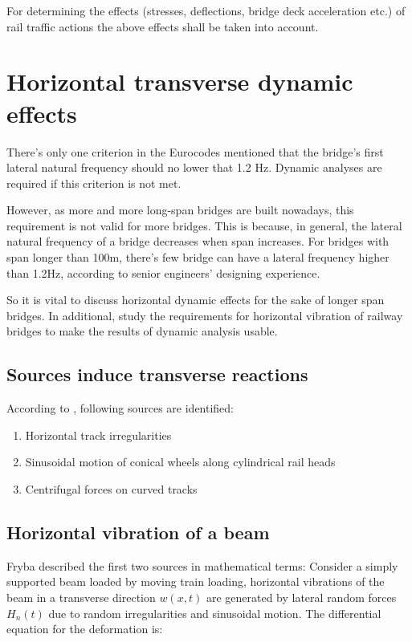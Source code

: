 For determining the effects (stresses, deflections, bridge deck acceleration etc.) of rail traffic actions the above effects shall be taken into account.


\section{Horizontal transverse dynamic effects}
There's only one criterion in the Eurocodes mentioned that the bridge's first lateral natural frequency should no lower that 1.2 Hz. Dynamic analyses are required if this criterion is not met. 

However, as more and more long-span bridges are built nowadays, this requirement is not valid for more bridges. This is because, in general, the lateral natural frequency of a bridge decreases when span increases. For bridges with span longer than 100m, there's few bridge can have a lateral frequency higher than 1.2Hz, according to senior engineers' designing experience.

So it is vital to discuss horizontal dynamic effects for the sake of longer span bridges. In additional, study the requirements for horizontal vibration of railway bridges to make the results of dynamic analysis usable.

\subsection{Sources induce transverse reactions}
According to \cite{da2007dynamic}\cite{fryba1996dynamics}\cite{EC12}, following sources are identified:

\begin{enumerate} [-]
	\item Horizontal track irregularities
	\item Sinusoidal motion of conical wheels along cylindrical rail heads
	\item Centrifugal forces on curved tracks
\end{enumerate}

\subsection{Horizontal vibration of a beam}

Fryba\cite{fryba1996dynamics} described the first two sources in mathematical terms:
Consider a simply supported beam loaded by moving train loading, horizontal vibrations of the beam in a transverse direction $ w(x,t) $ are generated by lateral random forces $ H_n (t) $ due to random irregularities and sinusoidal motion. The differential equation for the deformation is:

